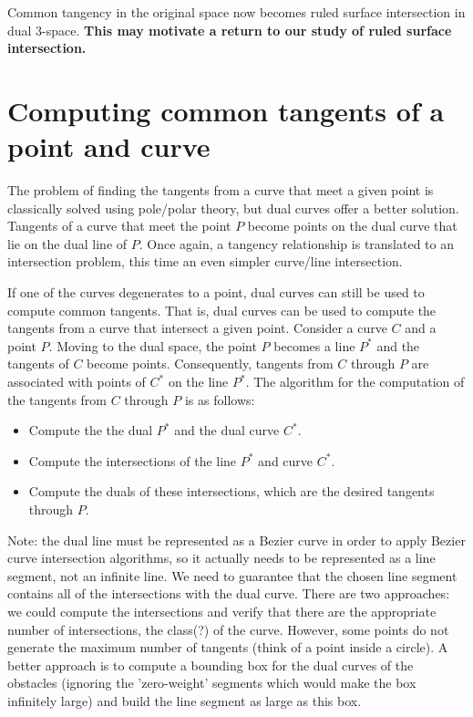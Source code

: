 \documentclass[11pt]{article}
\begin{document}
Common tangency in the original space now becomes ruled surface intersection
in dual 3-space.
{\bf This may motivate a return to our study of ruled surface intersection.}



\section{Computing common tangents of a point and curve}
\label{sec:point}

The problem of finding the tangents 
from a curve that meet a given point 
is classically solved using pole/polar theory,
but dual curves offer a better solution.
Tangents of a curve that meet the point $P$ become points on the dual curve
that lie on the dual line of $P$.
Once again, a tangency relationship is translated to an intersection problem,
this time an even simpler curve/line intersection.


If one of the curves degenerates to a point, dual curves can still
be used to compute common tangents.
That is, dual curves can be used to compute the tangents from a curve
that intersect a given point.
Consider a curve $C$ and a point $P$.
Moving to the dual space, the point $P$ becomes a line $P^*$
and the tangents of $C$ become points.
Consequently, tangents from $C$ through $P$ are associated
with points of $C^*$ on the line $P^*$.
The algorithm for the computation of the tangents from $C$ through $P$ is
as follows:
\begin{itemize}
\item	Compute the the dual $P^*$ and the dual curve $C^*$.
\item	Compute the intersections of the line $P^*$ and curve $C^*$.
\item	Compute the duals of these intersections,
	which are the desired tangents through $P$.
\end{itemize}

Note: the dual line must be represented as a Bezier curve in order to 
apply Bezier curve intersection algorithms, so it actually needs to be 
represented as a line segment, not an infinite line.
We need to guarantee that the chosen line segment contains all of the 
intersections with the dual curve.
There are two approaches: we could compute the intersections and verify
that there are the appropriate number of intersections, the class(?) of the 
curve.  However, some points do not generate the maximum number of 
tangents (think of a point inside a circle).
A better approach is to compute a bounding box for the dual
curves of the obstacles (ignoring the 'zero-weight' segments which would make
the box infinitely large) and build the line segment as large as this box.
\end{document}
